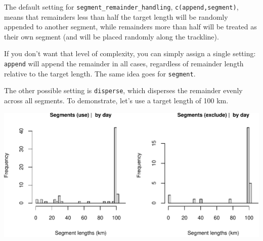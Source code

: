 \documentclass[
]{book}
\newenvironment{Shaded}{\begin{snugshade}}{\end{snugshade}}
\newcommand{\CommentTok}[1]{\textcolor[rgb]{0.56,0.35,0.01}{\textit{#1}}}
\newcommand{\DataTypeTok}[1]{\textcolor[rgb]{0.13,0.29,0.53}{#1}}
\newcommand{\DecValTok}[1]{\textcolor[rgb]{0.00,0.00,0.81}{#1}}
\newcommand{\KeywordTok}[1]{\textcolor[rgb]{0.13,0.29,0.53}{\textbf{#1}}}
\newcommand{\NormalTok}[1]{#1}
\newcommand{\OperatorTok}[1]{\textcolor[rgb]{0.81,0.36,0.00}{\textbf{#1}}}
\newcommand{\OtherTok}[1]{\textcolor[rgb]{0.56,0.35,0.01}{#1}}
\newcommand{\StringTok}[1]{\textcolor[rgb]{0.31,0.60,0.02}{#1}}
\begin{document}
The default setting for \texttt{segment\_remainder\_handling}, \texttt{c(\textquotesingle{}append\textquotesingle{},\textquotesingle{}segment\textquotesingle{})}, means that remainders less than half the target length will be randomly appended to another segment, while remainders more than half will be treated as their own segment (and will be placed randomly along the trackline).

If you don't want that level of complexity, you can simply assign a single setting: \texttt{\textquotesingle{}append\textquotesingle{}} will append the remainder in all cases, regardless of remainder length relative to the target length. The same idea goes for \texttt{\textquotesingle{}segment\textquotesingle{}}.

The other possible setting is \texttt{\textquotesingle{}disperse\textquotesingle{}}, which disperses the remainder evenly across all segments. To demonstrate, let's use a target length of 100 km.

\begin{Shaded}
\end{Shaded}

\includegraphics{figures/unnamed-chunk-380-1.pdf}
\end{document}
